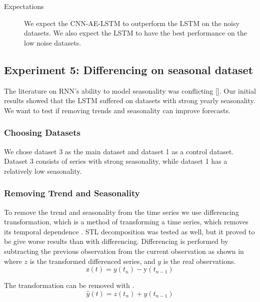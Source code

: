 \begin{description}
  \item[Expectations]{
              We expect the CNN-AE-LSTM to outperform the LSTM on the noisy datasets.
              We also expect the LSTM to have the best performance on the low noise datasets.
        }
\end{description}

\subsection{Experiment 5: Differencing on seasonal dataset}
The literature on RNN's ability to model seasonality was conflicting [].
Our initial results showed that the LSTM suffered on datasets with strong yearly seasonality.
We want to test if removing trends and seasonality can improve forecasts.

\subsubsection{Choosing Datasets}
We chose dataset 3 as the main dataset and dataset 1 as a control dataset.
Dataset 3 consists of series with strong seasonality, while dataset 1 has a relatively low seasonality.

\subsubsection{Removing Trend and Seasonality}
To remove the trend and seasonality from the time series
we use differencing transformation, which is a method of transforming a time series,
which removes its temporal dependence \cite[p. 215]{RobJHyndman2014}.
STL decomposition was tested as well, but it proved to be give worse results than with differencing.
Differencing is performed by subtracting the previous observation from the current
observation as shown in  where $z$ is the
transformed differenced series, and $y$ is the real observations.
\begin{equation}
  \text{z}(t) = y(t_n) - \text{y}(t_{ n-1 })
  \label{eq:differencing}
\end{equation}

The transformation can be removed with .
\begin{equation}
  \hat{y}(t) = z(t_n) + y(t_{ n-1 })
  \label{eq:differencing-inverted}
\end{equation}

